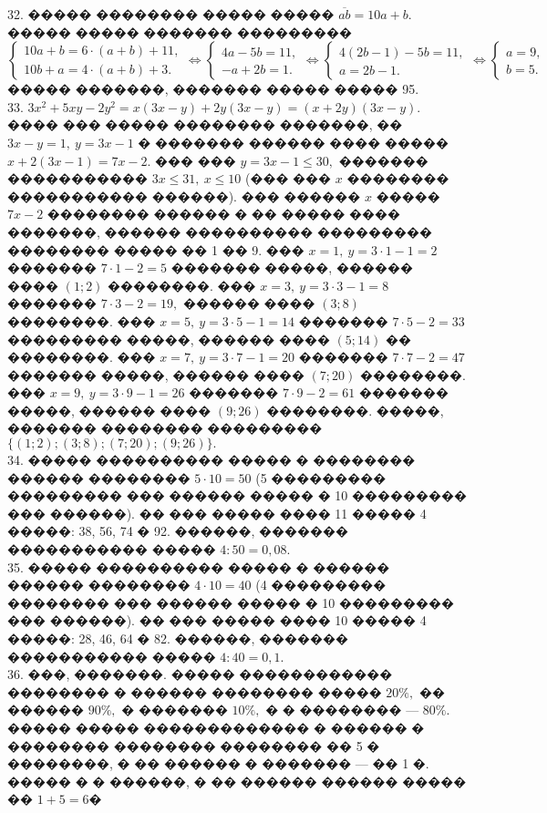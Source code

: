 \documentclass[12pt]{article}
\begin{document}
32. ����� �������� ����� ����� $\overline{ab}=10a+b.$ ����� ����� ������� ��������� \\$\begin{cases} 10a+b=6\cdot(a+b)+11,\\ 10b+a=4\cdot(a+b)+3.\end{cases}\Leftrightarrow \begin{cases} 4a-5b=11,\\ -a+2b=1.\end{cases}\Leftrightarrow \begin{cases} 4(2b-1)-5b=11,\\ a=2b-1.\end{cases}
\Leftrightarrow \begin{cases} a=9,\\ b=5.\end{cases}$ ����� �������, ������� ����� ����� 95.\\
33. $3x^2+5xy-2y^2=x(3x-y)+2y(3x-y)=(x+2y)(3x-y).$ ���� ��� ����� �������� �������, �� $3x-y=1,\ y=3x-1$ � ������� ������ ���� ����� $x+2(3x-1)=7x-2.$ ��� ��� $y=3x-1\leqslant30,$ ������� ����������� $3x\leqslant31,\ x\leqslant 10$ (��� ��� $x$ �������� ����������� ������). ��� ������ $x$ ����� $7x-2$ �������� ������ � �� ����� ���� �������, ������ ���������� ��������� �������� ����� �� 1 �� 9. ��� $x=1,\ y=3\cdot1-1=2$ ������� $7\cdot1-2=5$ ������� �����, ������ ���� $(1;2)$ ��������. ��� $x=3,\ y=3\cdot3-1=8$ ������� $7\cdot3-2=19,$ ������ ���� $(3;8)$ ��������. ��� $x=5,\ y=3\cdot5-1=14$ ������� $7\cdot5-2=33$ ��������� �����, ������ ���� $(5;14)$ �� ��������. ��� $x=7,\ y=3\cdot7-1=20$ ������� $7\cdot7-2=47$ ������� �����, ������ ���� $(7;20)$ ��������. ��� $x=9,\ y=3\cdot9-1=26$ ������� $7\cdot9-2=61$ ������� �����, ������ ���� $(9;26)$ ��������. �����, ������� �������� ��������� $\{(1;2); (3;8); (7;20); (9;26)\}.$\\
34. ����� ���������� ����� � �������� ������ �������� $5\cdot10=50$ (5 ��������� ��������� ��� ������ ����� � 10 ��������� ��� ������). �� ��� ����� ���� 11 �����
4 �����: 38, 56, 74 � 92. ������, ������� ����������� ����� $4:50=0,08.$\\
35. ����� ���������� ����� � ������ ������ �������� $4\cdot10=40$ (4 ��������� �������� ��� ������ ����� � 10 ��������� ��� ������). �� ��� ����� ���� 10 �����
4 �����: 28, 46, 64 � 82. ������, ������� ����������� ����� $4:40=0,1.$\\
36. ���, �������. ����� ������������ �������� � ������ �������� ����� $20\%,$ �� ������ $90\%,$ � ������� $10\%,$ � � �������� --- $80\%.$ ����� ����� ������������� � ������ � �������� �������� �������� �� 5 � ��������, � �� ������ � ������� --- �� 1 �. ����� � � ������, � �� ������ ������ ����� �� $1+5=6$�
\end{document}
